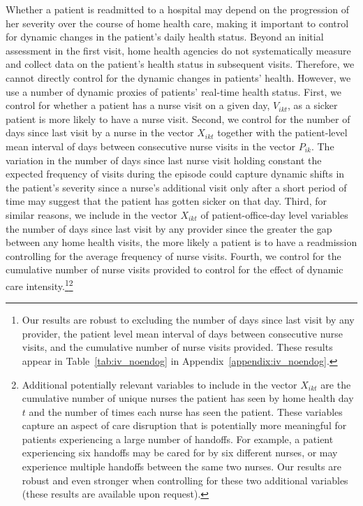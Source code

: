 \documentclass[final,12pt, notitlepage]{article}
\begin{document}
Whether a patient is readmitted to a hospital may depend on the progression of her severity over the course of home health care, making it important to control for dynamic changes in the patient's daily health status.
Beyond an initial assessment in the first visit, home health agencies do not systematically measure and collect data on the patient's health status in subsequent visits.
Therefore, we cannot directly control for the dynamic changes in patients' health.
However, we use a number of dynamic proxies of patients' real-time health status.
First, we control for whether a patient has a nurse visit on a given day, $V_{ikt}$, as a sicker patient is more likely to have a nurse visit.
Second, we control for the number of days since last visit by a nurse in the vector $X_{ikt}$ together with the patient-level mean interval of days between consecutive nurse visits in the vector $P_{ik}$. The variation in the number of days since last nurse visit holding constant the expected frequency of visits during the episode could capture dynamic shifts in the patient's severity since a nurse's additional visit only after a short period of time may suggest that the patient has gotten sicker on that day. Third, for similar reasons, we include in the vector $X_{ikt}$ of patient-office-day level variables the number of days since last visit by any provider since the greater the gap between any home health visits, the more likely a patient is to have a readmission controlling for the average frequency of nurse visits.  Fourth, we control for the cumulative number of nurse visits provided to control for the effect of dynamic care intensity.\footnote{Our results are robust to excluding the number of days since last visit by any provider, the patient level mean interval of days between consecutive nurse visits, and the cumulative number of nurse visits provided. These results appear in Table~\ref{tab:iv_noendog} in Appendix~\ref{appendix:iv_noendog}.}\footnote{Additional potentially relevant variables to include in the vector $X_{ikt}$ are the cumulative number of unique nurses the patient has seen by home health day $t$ and the number of times each nurse has seen the patient. These variables capture an aspect of care disruption that is potentially more meaningful for patients experiencing a large number of handoffs. For example, a patient experiencing six handoffs may be cared for by six different nurses, or may experience multiple handoffs between the same two nurses. Our results are robust and even stronger when controlling for these two additional variables (these results are available upon request).}
\end{document}

